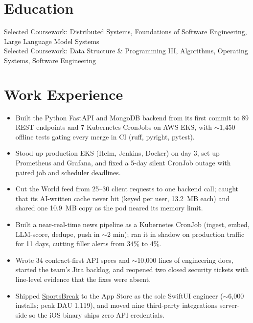 \documentclass[11pt, letterpaper]{article}
\begin{document}

\section{Education}
Selected Coursework: Distributed Systems, Foundations of Software Engineering, Large Language Model Systems\\[1pt]
Selected Coursework: Data Structure \& Programming III, Algorithms, Operating Systems, Software Engineering

\section{Work Experience}
\begin{itemize}
  \item Built the Python FastAPI and MongoDB backend from its first commit to 89 REST endpoints and 7 Kubernetes CronJobs on AWS EKS, with $\sim$1{,}450 offline tests gating every merge in CI (ruff, pyright, pytest).
  \item Stood up production EKS (Helm, Jenkins, Docker) on day 3, set up Prometheus and Grafana, and fixed a 5-day silent CronJob outage with paired job and scheduler deadlines.
  \item Cut the World feed from 25--30 client requests to one backend call; caught that its AI-written cache never hit (keyed per user, 13.2~MB each) and shared one 10.9~MB copy as the pod neared its memory limit.
  \item Built a near-real-time news pipeline as a Kubernetes CronJob (ingest, embed, LLM-score, dedupe, push in $\sim$2 min); ran it in shadow on production traffic for 11 days, cutting filler alerts from 34\% to 4\%.
  \item Wrote 34 contract-first API specs and $\sim$10{,}000 lines of engineering docs, started the team's Jira backlog, and reopened two closed security tickets with line-level evidence that the fixes were absent.
  \item Shipped \href{https://apps.apple.com/app/id6762649287}{SportsBreak} to the App Store as the sole SwiftUI engineer ($\sim$6{,}000 installs; peak DAU 1{,}119), and moved nine third-party integrations server-side so the iOS binary ships zero API credentials.
\end{itemize}
\end{document}
